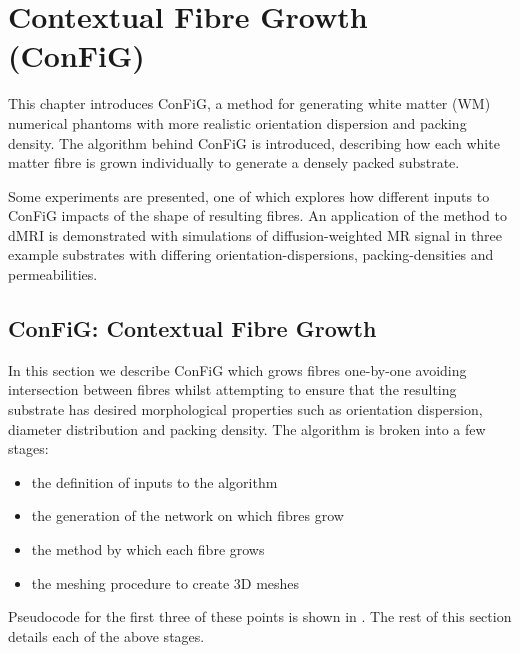 \chapter{Contextual Fibre Growth (ConFiG)}
\label{sec:config}

\chaptertoc{}

\begin{chapterabstract}
  This chapter introduces \ac{ConFiG}, a method for generating white matter (WM) numerical phantoms with more realistic orientation dispersion and packing density.
  The algorithm behind \ac{ConFiG} is introduced, describing how each white matter fibre is grown individually to generate a densely packed substrate.
  
  Some experiments are presented, one of which explores how different inputs to \ac{ConFiG} impacts of the shape of resulting fibres. 
  An application of the method to dMRI is demonstrated with simulations of diffusion-weighted MR signal in three example substrates with differing orientation-dispersions, packing-densities and permeabilities.
\end{chapterabstract}


\section{ConFiG: Contextual Fibre Growth}
\label{sec:fibre_growth_algorithm}
In this section we describe ConFiG  which grows fibres one-by-one avoiding intersection between fibres whilst attempting to ensure that the resulting substrate has desired morphological properties such as orientation dispersion, diameter distribution and packing density.
The algorithm is broken into a few stages:
\begin{itemize}
\item the definition of inputs to the algorithm
\item the generation of the network on which fibres grow
\item the method by which each fibre grows
\item the meshing procedure to create 3D meshes
\end{itemize}
Pseudocode for the first three of these points is shown in . The rest of this section details each of the above stages.

